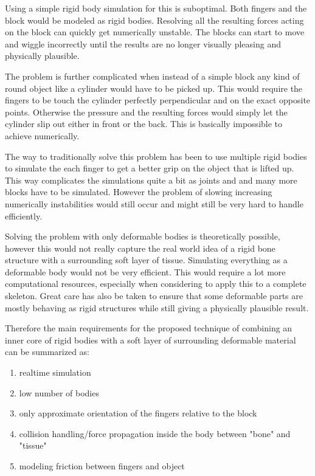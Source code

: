 Using a simple rigid body simulation for this is suboptimal. Both fingers and the block would be modeled as rigid bodies. Resolving all the resulting forces acting on the block can quickly get numerically unstable. The blocks can start to move and wiggle incorrectly until the results are no longer visually pleasing and physically plausible.

The problem is further complicated when instead of a simple block any kind of round object like a cylinder would have to be picked up. This would require the fingers to be touch the cylinder perfectly perpendicular and on the exact opposite points. Otherwise the pressure and the resulting forces would simply let the cylinder slip out either in front or the back. This is basically impossible to achieve numerically.

The way to traditionally solve this problem has been to use multiple rigid bodies to simulate the each finger to get a better grip on the object that is lifted up. This way complicates the simulations quite a bit as joints and and many more blocks have to be simulated. However the problem of slowing increasing numerically instabilities would still occur and might still be very hard to handle efficiently.

Solving the problem with only deformable bodies is theoretically possible, however this would not really capture the real world idea of a rigid bone structure with a surrounding soft layer of tissue. Simulating everything as a deformable body would not be very efficient. This would require a lot more computational resources, especially when considering to apply this to a complete skeleton. Great care has also be taken to ensure that some deformable parts are mostly behaving as rigid structures while still giving a physically plausible result.

Therefore the main requirements for the proposed technique of combining an inner core of rigid bodies with a soft layer of surrounding deformable material can be summarized as:

\begin{enumerate}
\item realtime simulation
\item	low number of bodies
\item only approximate orientation of the fingers relative to the block
\item collision handling/force propagation inside the body between "bone" and "tissue"
\item modeling friction between fingers and object
\end{enumerate}
